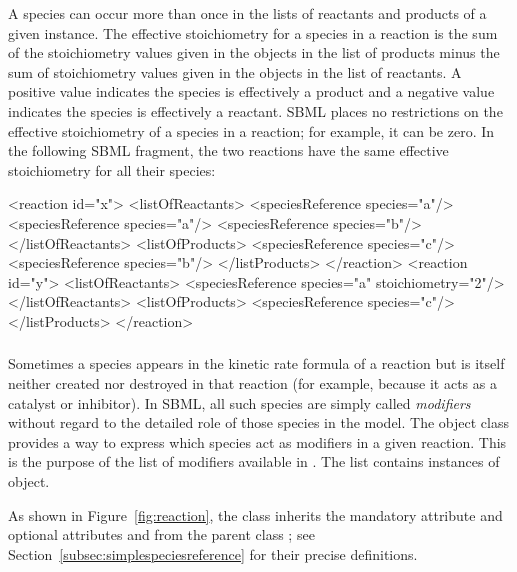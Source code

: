 A species can occur more than once in the lists of reactants and
products of a given \Reaction instance.  The effective
stoichiometry for a species in a reaction is the sum of the
stoichiometry values given in the \SpeciesReference objects in
the list of products minus the sum of stoichiometry values given
in the \SpeciesReference objects in the list of reactants.  A
positive value indicates the species is effectively a product and
a negative value indicates the species is effectively a reactant.
SBML places no restrictions on the effective stoichiometry of a
species in a reaction; for example, it can be zero.  In the
following SBML fragment, the two reactions have the same effective
stoichiometry for all their species:

\begin{example}
<reaction id="x">
    <listOfReactants>
        <speciesReference species="a"/>
        <speciesReference species="a"/>
        <speciesReference species="b"/>
    </listOfReactants>
    <listOfProducts>
        <speciesReference species="c"/>
        <speciesReference species="b"/>
    </listProducts>
</reaction>
<reaction id="y">
    <listOfReactants>
        <speciesReference species="a" stoichiometry="2"/>
    </listOfReactants>
    <listOfProducts>
        <speciesReference species="c"/>
    </listProducts>
</reaction>
\end{example}


\subsubsection{}
\label{subsec:modifierreference}

Sometimes a species appears in the kinetic rate formula of a
reaction but is itself neither created nor destroyed in that
reaction (for example, because it acts as a catalyst or
inhibitor).  In SBML, all such species are simply called
\emph{modifiers} without regard to the detailed role of those
species in the model.  The \Reaction object class provides a way to
express which species act as modifiers in a given reaction.  This
is the purpose of the list of modifiers available in \Reaction.
The list contains instances of \ModifierSpeciesReference
object.

As shown in Figure~\vref{fig:reaction}, the
\ModifierSpeciesReference class inherits the mandatory attribute
 and optional attributes  and 
from the parent class \SimpleSpeciesReference; see
Section~\ref{subsec:simplespeciesreference} for their precise
definitions.

